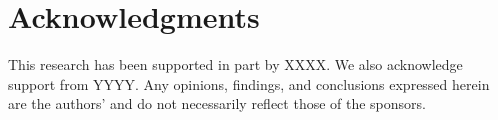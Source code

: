 \section{Acknowledgments}
\label{sec:acknowledgments}

This research has been supported in part by XXXX. We also acknowledge support from YYYY. Any opinions, findings, and conclusions expressed herein are the authors’ and do not necessarily reflect those of the sponsors.

